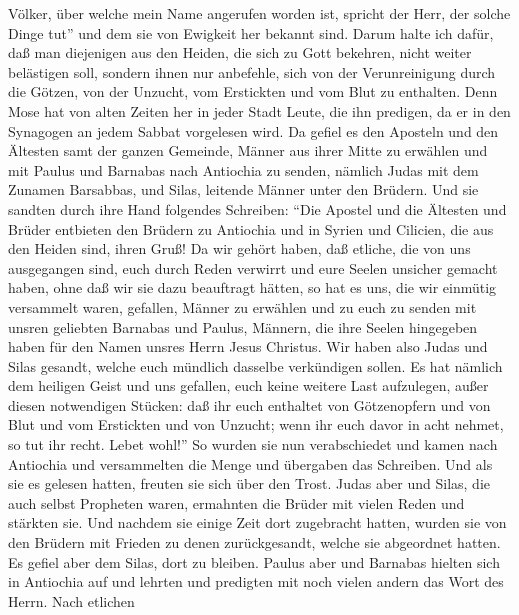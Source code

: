 Völker, über welche mein Name angerufen worden ist, spricht der Herr,
der solche Dinge tut''  und dem sie von Ewigkeit her
bekannt sind.  Darum halte ich dafür, daß man diejenigen
aus den Heiden, die sich zu Gott bekehren, nicht weiter belästigen soll,
 sondern ihnen nur anbefehle, sich von der Verunreinigung
durch die Götzen, von der Unzucht, vom Erstickten und vom Blut zu
enthalten.  Denn Mose hat von alten Zeiten her in jeder
Stadt Leute, die ihn predigen, da er in den Synagogen an jedem Sabbat
vorgelesen wird.  Da gefiel es den Aposteln und den
Ältesten samt der ganzen Gemeinde, Männer aus ihrer Mitte zu erwählen
und mit Paulus und Barnabas nach Antiochia zu senden, nämlich Judas mit
dem Zunamen Barsabbas, und Silas, leitende Männer unter den Brüdern.
 Und sie sandten durch ihre Hand folgendes Schreiben:
``Die Apostel und die Ältesten und Brüder entbieten den Brüdern zu
Antiochia und in Syrien und Cilicien, die aus den Heiden sind, ihren
Gruß!  Da wir gehört haben, daß etliche, die von uns
ausgegangen sind, euch durch Reden verwirrt und eure Seelen unsicher
gemacht haben, ohne daß wir sie dazu beauftragt hätten, 
so hat es uns, die wir einmütig versammelt waren, gefallen, Männer zu
erwählen und zu euch zu senden mit unsren geliebten Barnabas und Paulus,
 Männern, die ihre Seelen hingegeben haben für den Namen
unsres Herrn Jesus Christus.  Wir haben also Judas und
Silas gesandt, welche euch mündlich dasselbe verkündigen sollen.
 Es hat nämlich dem heiligen Geist und uns gefallen, euch
keine weitere Last aufzulegen, außer diesen notwendigen Stücken:
 daß ihr euch enthaltet von Götzenopfern und von Blut und
vom Erstickten und von Unzucht; wenn ihr euch davor in acht nehmet, so
tut ihr recht. Lebet wohl!''  So wurden sie nun
verabschiedet und kamen nach Antiochia und versammelten die Menge und
übergaben das Schreiben.  Und als sie es gelesen hatten,
freuten sie sich über den Trost.  Judas aber und Silas,
die auch selbst Propheten waren, ermahnten die Brüder mit vielen Reden
und stärkten sie.  Und nachdem sie einige Zeit dort
zugebracht hatten, wurden sie von den Brüdern mit Frieden zu denen
zurückgesandt, welche sie abgeordnet hatten.  Es gefiel
aber dem Silas, dort zu bleiben.  Paulus aber und
Barnabas hielten sich in Antiochia auf und lehrten und predigten mit
noch vielen andern das Wort des Herrn.  Nach etlichen
